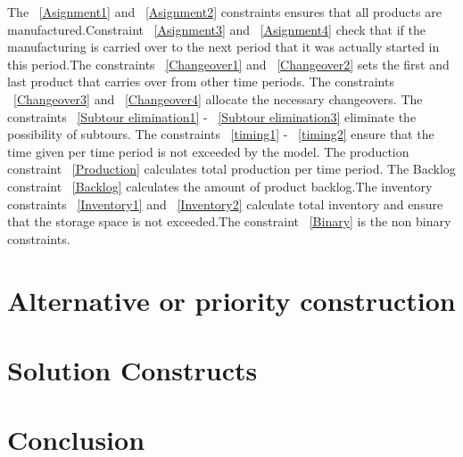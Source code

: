 \documentclass[a4paper,11pt,fleqn]{report}
\begin{document}
        The ~\eqref{Asignment1} and ~\eqref{Asignment2} constraints ensures that all products are manufactured.Constraint ~\eqref{Asignment3} and ~\eqref{Asignment4} check that if the manufacturing is carried over to the next period that it was actually started in this period.The constraints ~\eqref{Changeover1} and ~\eqref{Changeover2} sets the first and last product that carries over from other time periods. The constraints ~\eqref{Changeover3} and ~\eqref{Changeover4} allocate the necessary changeovers. The constraints ~\eqref{Subtour elimination1} - ~\eqref{Subtour elimination3} eliminate the possibility of subtours. The constraints ~\eqref{timing1} - ~\eqref{timing2} ensure that the time given per time period is not exceeded by the model. The production constraint ~\eqref{Production} calculates total production per time period. The Backlog constraint ~\eqref{Backlog} calculates the amount of product backlog.The inventory constraints ~\eqref{Inventory1} and ~\eqref{Inventory2} calculate total inventory and ensure that the storage space is not exceeded.The constraint ~\eqref{Binary} is the non binary constraints.
        
\chapter{Alternative or priority construction}       
\acresetall

\chapter{Solution Constructs} 
\acresetall

\chapter{Conclusion}
\acresetall



\appendix
\end{document}
